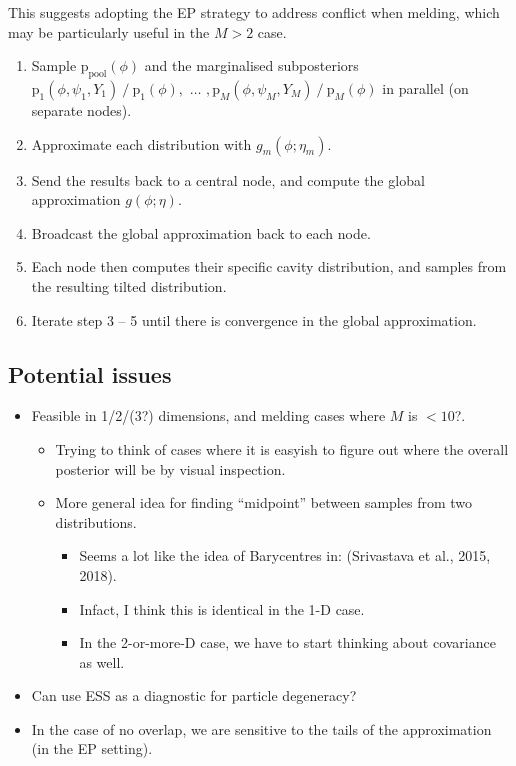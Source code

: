 \documentclass[10pt,a4paper,]{article}
\providecommand{\tightlist}{%
  \setlength{\itemsep}{0pt}\setlength{\parskip}{0pt}}
\newcommand{\pd}{\text{p}}
\newcommand{\ppoolphi}{\pd_{\text{pool}}(\phi)}
\newcommand{\Nm}{M}
\newcommand{\modelindex}{m}
\begin{document}
This suggests adopting the EP strategy to address conflict when melding,
which may be particularly useful in the \(\Nm > 2\) case.

\begin{enumerate}
\def\labelenumi{\arabic{enumi}.}
\tightlist
\item
  Sample \(\ppoolphi\) and the marginalised subposteriors
  \(\pd_{1}(\phi, \psi_{1}, Y_{1}) \mathop{/} \pd_{1}(\phi), \,\, \ldots\,\, , \pd_{\Nm}(\phi, \psi_{\Nm}, Y_{\Nm}) \mathop{/} \pd_{\Nm}(\phi)\)
  in parallel (on separate nodes).
\item
  Approximate each distribution with
  \(g_{\modelindex}(\phi; \eta_{\modelindex})\).
\item
  Send the results back to a central node, and compute the global
  approximation \(g(\phi; \eta)\).
\item
  Broadcast the global approximation back to each node.
\item
  Each node then computes their specific cavity distribution, and
  samples from the resulting tilted distribution.
\item
  Iterate step 3 -- 5 until there is convergence in the global
  approximation.
\end{enumerate}

\subsection{Potential issues}\label{potential-issues}

\begin{itemize}
\tightlist
\item
  Feasible in 1/2/(3?) dimensions, and melding cases where \(\Nm\) is
  \(<10\)?.

  \begin{itemize}
  \tightlist
  \item
    Trying to think of cases where it is easyish to figure out where the
    overall posterior will be by visual inspection.
  \item
    More general idea for finding ``midpoint'' between samples from two
    distributions.

    \begin{itemize}
    \tightlist
    \item
      Seems a lot like the idea of Barycentres in: (Srivastava et al.,
      2015, 2018).
    \item
      Infact, I think this is identical in the 1-D case.
    \item
      In the 2-or-more-D case, we have to start thinking about
      covariance as well.
    \end{itemize}
  \end{itemize}
\item
  Can use ESS as a diagnostic for particle degeneracy?
\item
  In the case of no overlap, we are sensitive to the tails of the
  approximation (in the EP setting).
\end{itemize}
\end{document}
